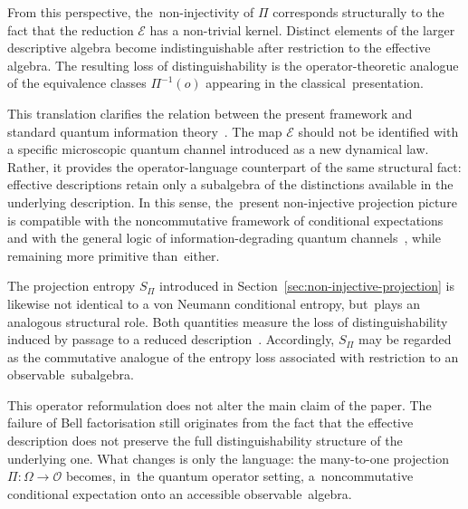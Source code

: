 \documentclass[11pt,a4paper]{article}
\theoremstyle{remark}
\begin{document}
    From this perspective, the~non-injectivity of $\Pi$ corresponds structurally to the fact
    that the reduction $\mathcal{E}$ has a non-trivial kernel.
    Distinct elements of the larger descriptive algebra become indistinguishable after
    restriction to the effective algebra.
    The resulting loss of distinguishability is the operator-theoretic analogue of the
    equivalence classes $\Pi^{-1}(o)$ appearing in the classical~presentation.

    This translation clarifies the relation between the present framework and standard
    quantum information theory~\cite{NielsenChuang2000}.
    The map $\mathcal{E}$ should not be identified with a specific microscopic quantum
    channel introduced as a new dynamical law.
    Rather, it provides the operator-language counterpart of the same structural fact:
    effective descriptions retain only a subalgebra of the distinctions available in the
    underlying description.
    In this sense, the~present non-injective projection picture is compatible with the
    noncommutative framework of conditional expectations and with the general logic of
    information-degrading quantum channels~\cite{Brunner2014}, while remaining more
    primitive than~either.

    The projection entropy $S_\Pi$ introduced in Section~\ref{sec:non-injective-projection} is likewise not identical to a
    von Neumann conditional entropy, but~plays an analogous structural role.
    Both quantities measure the loss of distinguishability induced by passage to a reduced
    description~\cite{NielsenChuang2000}.
    Accordingly, $S_\Pi$ may be regarded as the commutative analogue of the entropy loss
    associated with restriction to an observable~subalgebra.

    This operator reformulation does not alter the main claim of the paper.
    The failure of Bell factorisation still originates from the fact that the effective
    description does not preserve the full distinguishability structure of the underlying one.
    What changes is only the language: the many-to-one projection $\Pi : \Omega \to \mathcal{O}$
    becomes, in~the quantum operator setting, a~noncommutative conditional expectation onto
    an accessible observable~algebra.
\end{document}
